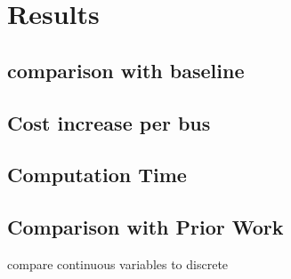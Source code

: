 \section{Results\label{sec:results}}

\subsection{comparison with baseline} 

\subsection{Cost increase per bus}

\subsection{Computation Time}

\subsection{Comparison with Prior Work}
compare continuous variables to discrete










